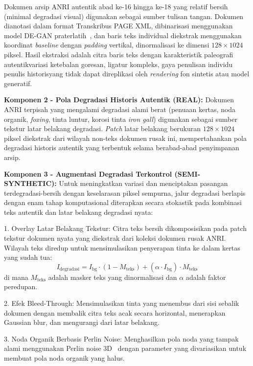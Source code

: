 \documentclass[journal]{IEEEtran}
\begin{document}
Dokumen arsip ANRI autentik abad ke-16 hingga ke-18 yang relatif bersih (minimal degradasi visual) digunakan sebagai sumber tulisan tangan. Dokumen dianotasi dalam format Transkribus PAGE XML, dibinarisasi menggunakan model DE-GAN praterlatih~\cite{souibgui2020degan}, dan baris teks individual diekstrak menggunakan koordinat \textit{baseline} dengan \textit{padding} vertikal, dinormalisasi ke dimensi $128 \times 1024$ piksel. Hasil ekstraksi adalah citra baris teks dengan karakteristik paleografi autentik\textemdash variasi ketebalan goresan, ligatur kompleks, gaya penulisan individu penulis historis\textemdash yang tidak dapat direplikasi oleh \textit{rendering} fon sintetis atau model generatif.

\textbf{Komponen 2 - Pola Degradasi Historis Autentik (REAL):}
Dokumen ANRI terpisah yang mengalami degradasi alami berat (penuaan kertas, noda organik, \textit{foxing}, tinta luntur, korosi tinta \textit{iron gall}) digunakan sebagai sumber tekstur latar belakang degradasi. \textit{Patch} latar belakang berukuran $128 \times 1024$ piksel diekstrak dari wilayah non-teks dokumen rusak ini, mempertahankan pola degradasi historis autentik yang terbentuk selama berabad-abad penyimpanan arsip.

\textbf{Komponen 3 - Augmentasi Degradasi Terkontrol (SEMI-SYNTHETIC):}
Untuk meningkatkan variasi dan menciptakan pasangan terdegradasi-bersih dengan keselarasan piksel sempurna, jalur degradasi berlapis dengan enam tahap komputasional diterapkan secara stokastik pada kombinasi teks autentik dan latar belakang degradasi nyata:

1. Overlay Latar Belakang Tekstur:
Citra teks bersih dikomposisikan pada patch tekstur dokumen nyata yang diekstrak dari koleksi dokumen rusak ANRI. Wilayah teks diredup untuk mensimulasikan penyerapan tinta ke dalam kertas yang sudah tua:
\begin{equation}
I_{\text{degradasi}} = I_{\text{bg}} \cdot (1 - M_{\text{teks}}) + (\alpha \cdot I_{\text{bg}}) \cdot M_{\text{teks}}
\end{equation}
di mana $M_{\text{teks}}$ adalah masker teks yang dinormalisasi dan $\alpha$ adalah faktor peredupan.

2. Efek Bleed-Through:
Mensimulasikan tinta yang menembus dari sisi sebalik dokumen dengan membalik citra teks acak secara horizontal, menerapkan Gaussian blur, dan mengurangi dari latar belakang.

3. Noda Organik Berbasis Perlin Noise:
Menghasilkan pola noda yang tampak alami menggunakan Perlin noise 3D~\cite{perlin1985image} dengan parameter yang divariasikan untuk membuat pola noda organik yang halus.
\end{document}

